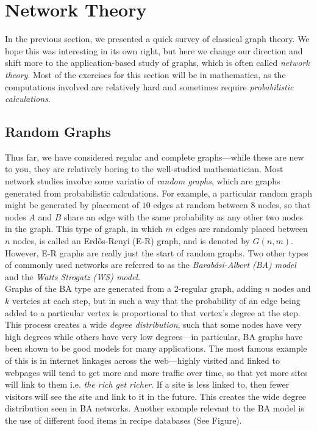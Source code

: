 \documentclass[12pt]{article}
\newcounter{exercise}[section]
\begin{document}
\section{Network Theory}
In the previous section, we presented a quick survey of classical graph theory. We hope this was interesting in its own right, but here we change our direction and shift more to the application-based study of graphs, which is often called \emph{network theory}. Most of the exercises for this section will be in mathematica, as the computations involved are relatively hard and sometimes require \emph{probabilistic calculations}.
\subsection{Random Graphs}
Thus far, we have considered regular and complete graphs---while these are new to you, they are relatively boring to the well-studied mathematician. Most network studies involve some variatio of \emph{random graphs}, which are graphs generated from probabilistic calculations. For example, a particular random graph might be generated by placement of $10$ edges at random between $8$ nodes, so that nodes $A$ and $B$ share an edge with the same probability as any other two nodes in the graph. This type of graph, in which $m$ edges are randomly placed between $n$ nodes, is called an Erdős-Renyí (E-R) graph, and is denoted by $G(n,m)$.
\\
However, E-R graphs are really just the start of random graphs. Two other types of commonly used networks are referred to as the \emph{Barabási-Albert (BA) model} and the \emph{Watts Strogatz (WS) model}. \\Graphs of the BA type are generated from a 2-regular graph, adding $n$ nodes and $k$ vertcies at each step, but in such a way that the probability of an edge being added to a particular vertex is proportional to that vertex's degree at the step. This process creates a wide \emph{degree distribution}, such that some nodes have very high degrees while others have very low degrees---in particular, BA graphs have been shown to be good models for many applications. The most famous example of this is in internet linkages across the web---highly visited and linked to webpages will tend to get more and more traffic over time, so that yet more sites will link to them i.e. \emph{the rich get richer}. If a site is less linked to, then fewer visitors will see the site and link to it in the future. This creates the wide degree distribution seen in BA networks. Another example relevant to the BA model is the use of different food items in recipe databases (See Figure).
\end{document}
